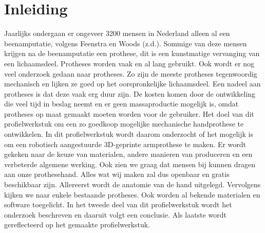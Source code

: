 \hypertarget{inleiding}{%
\section{Inleiding}\label{inleiding}}

Jaarlijks ondergaan er ongeveer 3200 mensen in Nederland alleen al een
beenamputatie, volgens Feenstra en Woods (z.d.). Sommige van deze mensen
krijgen na de beenamputatie een prothese, dit is een kunstmatige
vervanging van een lichaamsdeel. Protheses worden vaak en al lang
gebruikt. Ook wordt er nog veel onderzoek gedaan naar protheses. Zo zijn
de meeste protheses tegenwoordig mechanisch en lijken ze goed op het
oorspronkelijke lichaamsdeel. Een nadeel aan protheses is dat deze vaak
erg duur zijn. De kosten komen door de ontwikkeling die veel tijd in
beslag neemt en er geen massaproductie mogelijk is, omdat protheses op
maat gemaakt moeten worden voor de gebruiker. Het doel van dit
profielwerkstuk om een zo goedkoop mogelijke mechanische handprothese te
ontwikkelen. In dit profielwerkstuk wordt daarom onderzocht of het
mogelijk is om een robotisch aangestuurde 3D-geprinte armprothese te
maken. Er wordt gekeken naar de keuze van materialen, andere manieren
van produceren en een verbeterde algemene werking. Ook zien we graag dat
mensen bij kunnen dragen aan onze prothesehand. Alles wat wij maken zal
dus openbaar en gratis beschikbaar zijn. Allereerst wordt de anatomie
van de hand uitgelegd. Vervolgens kijken we naar enkele bestaande
protheses. Ook worden al bekende materialen en software toegelicht. In
het tweede deel van dit profielwerkstuk wordt het onderzoek beschreven
en daaruit volgt een conclusie. Als laatste wordt gereflecteerd op het
gemaakte profielwerkstuk.
